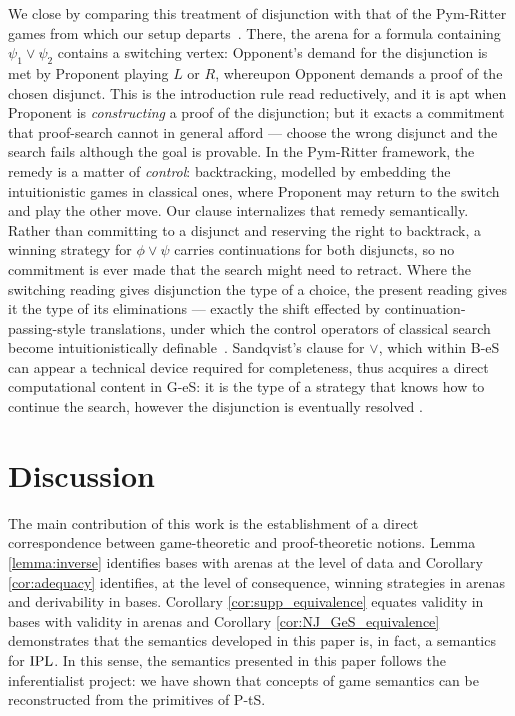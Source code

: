 \documentclass{lipics-v2021}
\begin{document}
We close by comparing this treatment of disjunction with that of the Pym-Ritter games from which our setup departs~\cite{Pym_ReductiveLogic}.
There, the arena for a formula containing $\psi_1 \lor \psi_2$ contains a switching vertex: Opponent's demand for the disjunction is met by Proponent playing $L$ or $R$, whereupon Opponent demands a proof of the chosen disjunct. This is the introduction rule read reductively, and it is apt when Proponent is \emph{constructing} a proof of the disjunction; but it exacts a commitment that proof-search cannot in general afford --- choose the wrong disjunct and the search fails although the goal is provable. In the Pym-Ritter framework, the remedy is a matter of \emph{control}: backtracking, modelled by embedding the intuitionistic games in classical ones, where Proponent may return to the switch and play the other move. Our clause internalizes that remedy semantically. Rather than committing to a disjunct and reserving the right to backtrack, a winning strategy for $\phi \lor \psi$ carries continuations for both disjuncts, so no commitment is ever made that the search might need to retract. Where the switching reading gives disjunction the type of a choice, the present reading gives it the type of its eliminations --- exactly the shift effected by continuation-passing-style translations, under which the control operators of classical search become intuitionistically definable~\cite{Pym_ReductiveLogic}. Sandqvist's clause
for $\lor$, which within B-eS can appear a technical device required for completeness, thus acquires a direct computational content in G-eS: it is the type of a strategy that knows how to continue the search, however the disjunction is eventually resolved \cite{GPRR-ContCompPtS2026}.

\section{Discussion} 
\label{sec:discussion}

The main contribution of this work is  the establishment of a direct correspondence between game-theoretic and proof-theoretic notions. Lemma \ref{lemma:inverse} identifies bases with arenas at the level of data and Corollary \ref{cor:adequacy} identifies, at the level of consequence, winning strategies in arenas and derivability in bases. Corollary \ref{cor:supp_equivalence} equates validity in bases with validity in arenas and Corollary \ref{cor:NJ_GeS_equivalence} demonstrates that the semantics developed in this paper is, in fact, a semantics for $\rm IPL$. In this sense, the semantics presented in this paper follows the inferentialist project: we have shown that concepts of game semantics can be reconstructed from the primitives of P-tS. 
\end{document}
